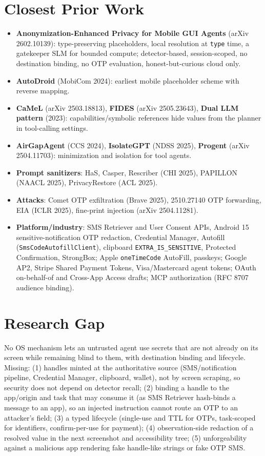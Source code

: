 \documentclass[11pt]{article}
\begin{document}
\section{Closest Prior Work}
\begin{itemize}
  \item \textbf{Anonymization-Enhanced Privacy for Mobile GUI Agents} (arXiv 2602.10139): type-preserving placeholders, local resolution at \texttt{type} time, a gatekeeper SLM for bounded compute; detector-based, session-scoped, no destination binding, no OTP evaluation, honest-but-curious cloud only.
  \item \textbf{AutoDroid} (MobiCom 2024): earliest mobile placeholder scheme with reverse mapping.
  \item \textbf{CaMeL} (arXiv 2503.18813), \textbf{FIDES} (arXiv 2505.23643), \textbf{Dual LLM pattern} (2023): capabilities/symbolic references hide values from the planner in tool-calling settings.
  \item \textbf{AirGapAgent} (CCS 2024), \textbf{IsolateGPT} (NDSS 2025), \textbf{Progent} (arXiv 2504.11703): minimization and isolation for tool agents.
  \item \textbf{Prompt sanitizers}: HaS, Casper, Rescriber (CHI 2025), PAPILLON (NAACL 2025), PrivacyRestore (ACL 2025).
  \item \textbf{Attacks}: Comet OTP exfiltration (Brave 2025), 2510.27140 OTP forwarding, EIA (ICLR 2025), fine-print injection (arXiv 2504.11281).
  \item \textbf{Platform/industry}: SMS Retriever and User Consent APIs, Android 15 sensitive-notification OTP redaction, Credential Manager, Autofill (\texttt{SmsCodeAutofillClient}), clipboard \texttt{EXTRA\_IS\_SENSITIVE}, Protected Confirmation, StrongBox; Apple \texttt{oneTimeCode} AutoFill, passkeys; Google AP2, Stripe Shared Payment Tokens, Visa/Mastercard agent tokens; OAuth on-behalf-of and Cross-App Access drafts; MCP authorization (RFC 8707 audience binding).
\end{itemize}

\section{Research Gap}
No OS mechanism lets an untrusted agent use secrets that are not already on its screen while remaining blind to them, with destination binding and lifecycle. Missing: (1) handles minted at the authoritative source (SMS/notification pipeline, Credential Manager, clipboard, wallet), not by screen scraping, so security does not depend on detector recall; (2) binding a handle to the app/origin and task that may consume it (as SMS Retriever hash-binds a message to an app), so an injected instruction cannot route an OTP to an attacker's field; (3) a typed lifecycle (single-use and TTL for OTPs, task-scoped for identifiers, confirm-per-use for payment); (4) observation-side redaction of a resolved value in the next screenshot and accessibility tree; (5) unforgeability against a malicious app rendering fake handle-like strings or fake OTP SMS.
\end{document}
